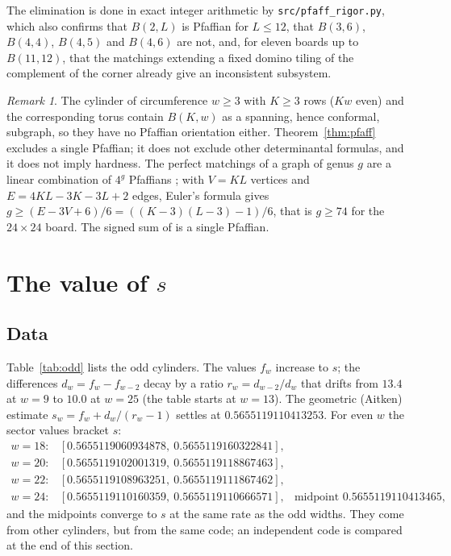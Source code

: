 \documentclass[11pt]{amsart}
\theoremstyle{definition}
\theoremstyle{remark}
\newtheorem{remark}[theorem]{Remark}
\newcommand{\file}[1]{\texttt{#1}}
\begin{document}
The elimination is done in exact integer arithmetic by \file{src/pfaff\_rigor.py}, which also
confirms that $B(2, L)$ is Pfaffian for $L \le 12$, that $B(3, 6)$, $B(4, 4)$, $B(4, 5)$ and
$B(4, 6)$ are not, and, for eleven boards up to $B(11, 12)$, that the matchings extending a fixed
domino tiling of the complement of the corner already give an inconsistent subsystem.

\begin{remark}
The cylinder of circumference $w \ge 3$ with $K \ge 3$ rows ($Kw$ even) and the corresponding
torus contain $B(K, w)$ as a spanning, hence conformal, subgraph, so they have no Pfaffian
orientation either. Theorem~\ref{thm:pfaff} excludes a single Pfaffian; it does not exclude
other determinantal formulas, and it does not imply hardness. The perfect matchings of a graph
of genus $g$ are a linear combination of $4^g$ Pfaffians \cite{galluccioloebl1999,tesler2000};
with $V = KL$ vertices and $E = 4KL - 3K - 3L + 2$ edges, Euler's formula gives
$g \ge (E - 3V + 6)/6 = ((K-3)(L-3) - 1)/6$, that is $g \ge 74$ for the $24 \times 24$ board. The
signed sum of \cite{wildeboerseidel2020} is a single Pfaffian.
\end{remark}

\section{The value of \texorpdfstring{$s$}{s}}\label{sec:value}

\subsection{Data}
Table~\ref{tab:odd} lists the odd cylinders. The values $f_w$ increase to $s$; the differences
$d_w = f_w - f_{w-2}$ decay by a ratio $r_w = d_{w-2}/d_w$ that drifts from $13.4$ at $w = 9$ to
$10.0$ at $w = 25$ (the table starts at $w = 13$).
The geometric (Aitken) estimate $s_w = f_w + d_w/(r_w - 1)$ settles at $0.5655119110413253$.
For even $w$ the sector values bracket $s$:
\[
\begin{array}{rll}
  w = 18: & [0.5655119060934878,\ 0.5655119160322841], \\
  w = 20: & [0.5655119102001319,\ 0.5655119118867463], \\
  w = 22: & [0.5655119108963251,\ 0.5655119111867462], \\
  w = 24: & [0.5655119110160359,\ 0.5655119110666571], & \text{midpoint } 0.5655119110413465,
\end{array}
\]
and the midpoints converge to $s$ at the same rate as the odd widths. They come from other
cylinders, but from the same code; an independent code is compared at the end of this section.
\end{document}
